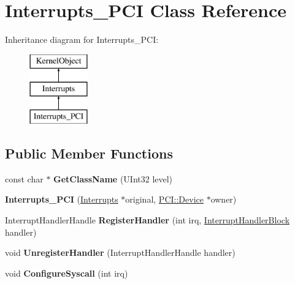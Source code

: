 \hypertarget{class_interrupts___p_c_i}{}\section{Interrupts\+\_\+\+P\+CI Class Reference}
\label{class_interrupts___p_c_i}
Inheritance diagram for Interrupts\+\_\+\+P\+CI\+:\begin{figure}[H]
\begin{center}
\leavevmode
\includegraphics[height=3.000000cm]{class_interrupts___p_c_i}
\end{center}
\end{figure}
\subsection*{Public Member Functions}
\begin{DoxyCompactItemize}
\item 
\mbox{\label{class_interrupts___p_c_i_a9b9521a5b19ef2963dfed625153bb13d}} 
const char $\ast$ {\bfseries Get\+Class\+Name} (U\+Int32 level)
\item 
\mbox{\label{class_interrupts___p_c_i_ae75e0bf0da3423e61dc457693de541a6}} 
{\bfseries Interrupts\+\_\+\+P\+CI} (\hyperlink{class_interrupts}{Interrupts} $\ast$original, \hyperlink{class_p_c_i_1_1_device}{P\+C\+I\+::\+Device} $\ast$owner)
\item 
\mbox{\label{class_interrupts___p_c_i_a6358fc2cf5f3d08f0b1946c61f5d5c97}} 
Interrupt\+Handler\+Handle {\bfseries Register\+Handler} (int irq, \hyperlink{classbicycle_1_1function}{Interrupt\+Handler\+Block} handler)
\item 
\mbox{\label{class_interrupts___p_c_i_abb7e3b8e41bdcf03193e53c317c05e41}} 
void {\bfseries Unregister\+Handler} (Interrupt\+Handler\+Handle handler)
\item 
\mbox{\label{class_interrupts___p_c_i_afa9d3d0653e7fa8f6a5fedc8038c9374}} 
void {\bfseries Configure\+Syscall} (int irq)
\end{DoxyCompactItemize}

